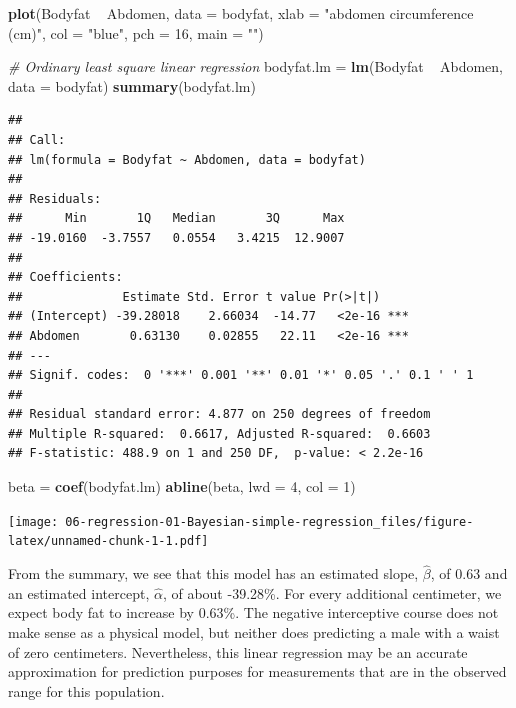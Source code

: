 \documentclass[]{book}
\newenvironment{Shaded}{\begin{snugshade}}{\end{snugshade}}
\newcommand{\KeywordTok}[1]{\textcolor[rgb]{0.13,0.29,0.53}{\textbf{{#1}}}}
\newcommand{\DataTypeTok}[1]{\textcolor[rgb]{0.13,0.29,0.53}{{#1}}}
\newcommand{\DecValTok}[1]{\textcolor[rgb]{0.00,0.00,0.81}{{#1}}}
\newcommand{\StringTok}[1]{\textcolor[rgb]{0.31,0.60,0.02}{{#1}}}
\newcommand{\CommentTok}[1]{\textcolor[rgb]{0.56,0.35,0.01}{\textit{{#1}}}}
\newcommand{\NormalTok}[1]{{#1}}
\theoremstyle{definition}
\theoremstyle{definition}
\theoremstyle{definition}
\theoremstyle{remark}
\begin{document}
\begin{Shaded}
\begin{Highlighting}[]
\KeywordTok{plot}\NormalTok{(Bodyfat ~}\StringTok{ }\NormalTok{Abdomen, }\DataTypeTok{data =} \NormalTok{bodyfat, }
     \DataTypeTok{xlab =} \StringTok{"abdomen circumference (cm)"}\NormalTok{, }
     \DataTypeTok{col =} \StringTok{"blue"}\NormalTok{, }\DataTypeTok{pch =} \DecValTok{16}\NormalTok{, }\DataTypeTok{main =} \StringTok{""}\NormalTok{)}

\CommentTok{# Ordinary least square linear regression}
\NormalTok{bodyfat.lm =}\StringTok{ }\KeywordTok{lm}\NormalTok{(Bodyfat ~}\StringTok{ }\NormalTok{Abdomen, }\DataTypeTok{data =} \NormalTok{bodyfat)}
\KeywordTok{summary}\NormalTok{(bodyfat.lm)}
\end{Highlighting}
\end{Shaded}

\begin{verbatim}
## 
## Call:
## lm(formula = Bodyfat ~ Abdomen, data = bodyfat)
## 
## Residuals:
##      Min       1Q   Median       3Q      Max 
## -19.0160  -3.7557   0.0554   3.4215  12.9007 
## 
## Coefficients:
##              Estimate Std. Error t value Pr(>|t|)    
## (Intercept) -39.28018    2.66034  -14.77   <2e-16 ***
## Abdomen       0.63130    0.02855   22.11   <2e-16 ***
## ---
## Signif. codes:  0 '***' 0.001 '**' 0.01 '*' 0.05 '.' 0.1 ' ' 1
## 
## Residual standard error: 4.877 on 250 degrees of freedom
## Multiple R-squared:  0.6617, Adjusted R-squared:  0.6603 
## F-statistic: 488.9 on 1 and 250 DF,  p-value: < 2.2e-16
\end{verbatim}

\begin{Shaded}
\begin{Highlighting}[]
\NormalTok{beta =}\StringTok{ }\KeywordTok{coef}\NormalTok{(bodyfat.lm)}
\KeywordTok{abline}\NormalTok{(beta, }\DataTypeTok{lwd =} \DecValTok{4}\NormalTok{, }\DataTypeTok{col =} \DecValTok{1}\NormalTok{)}
\end{Highlighting}
\end{Shaded}

\texttt{[image: 06-regression-01-Bayesian-simple-regression\_files/figure-latex/unnamed-chunk-1-1.pdf]}

From the summary, we see that this model has an estimated slope,
\(\hat{\beta}\), of 0.63 and an estimated intercept, \(\hat{\alpha}\),
of about -39.28\%. For every additional centimeter, we expect body fat
to increase by 0.63\%. The negative interceptive course does not make
sense as a physical model, but neither does predicting a male with a
waist of zero centimeters. Nevertheless, this linear regression may be
an accurate approximation for prediction purposes for measurements that
are in the observed range for this population.
\end{document}
